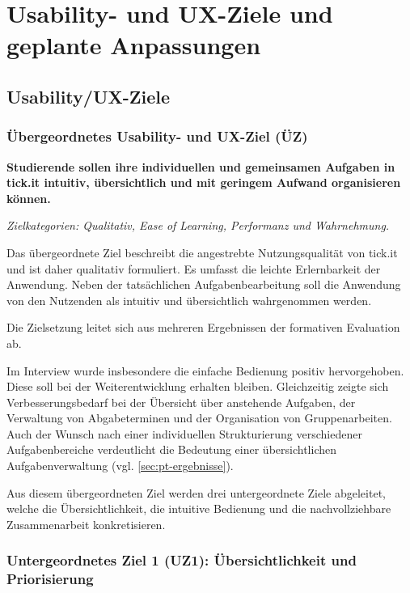 \chapter{Usability- und UX-Ziele und geplante Anpassungen}
\label{chap:uux_ziele}

\section{Usability/UX-Ziele}
\label{sec:pt-uux-ziele}

\subsection*{Übergeordnetes Usability- und UX-Ziel (ÜZ)}

\textbf{Studierende sollen ihre individuellen und gemeinsamen Aufgaben in tick.it intuitiv, übersichtlich und mit geringem Aufwand organisieren können.}

\textit{Zielkategorien: Qualitativ, Ease of Learning, Performanz und Wahrnehmung.}

Das übergeordnete Ziel beschreibt die angestrebte Nutzungsqualität von tick.it und ist daher qualitativ formuliert.
Es umfasst die leichte Erlernbarkeit der Anwendung.
Neben der tatsächlichen Aufgabenbearbeitung soll die Anwendung von den Nutzenden als intuitiv und übersichtlich wahrgenommen werden.

Die Zielsetzung leitet sich aus mehreren Ergebnissen der formativen Evaluation ab.

Im Interview wurde insbesondere die einfache Bedienung positiv hervorgehoben. Diese soll bei der Weiterentwicklung erhalten bleiben.
Gleichzeitig zeigte sich Verbesserungsbedarf bei der Übersicht über anstehende Aufgaben, der Verwaltung von Abgabeterminen und der Organisation von Gruppenarbeiten.
Auch der Wunsch nach einer individuellen Strukturierung verschiedener Aufgabenbereiche verdeutlicht die Bedeutung einer übersichtlichen Aufgabenverwaltung (vgl. \cref{sec:pt-ergebnisse}).

Aus diesem übergeordneten Ziel werden drei untergeordnete Ziele abgeleitet, welche die Übersichtlichkeit, die intuitive Bedienung und die nachvollziehbare Zusammenarbeit konkretisieren.


\subsection*{Untergeordnetes Ziel 1 (UZ1): Übersichtlichkeit und Priorisierung}

